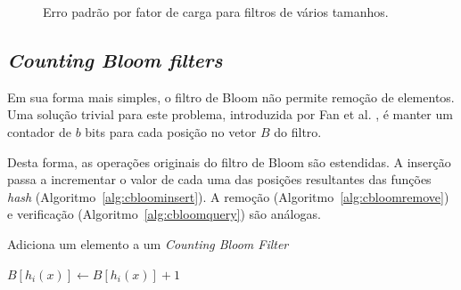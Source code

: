\begin{figure}[!htbp]
\centering
{}
\caption{Erro padrão por fator de carga para filtros de vários tamanhos.}
\label{fig:bloom_cardinality}
\end{figure}


\subsection{\emph{Counting Bloom filters}}\label{sec:bloom:counting}

Em sua forma mais simples, o filtro de Bloom não permite remoção de elementos. Uma solução trivial para este problema, introduzida por Fan et al. \cite{fan1998summary}, é manter um contador de $b$ bits para cada posição no vetor $B$ do filtro.

Desta forma, as operações originais do filtro de Bloom são estendidas. A inserção passa a incrementar o valor de cada uma das posições resultantes das funções \emph{hash} (Algoritmo~\ref{alg:cbloominsert}). A remoção (Algoritmo~\ref{alg:cbloomremove}) e verificação (Algoritmo~\ref{alg:cbloomquery}) são análogas.


\begin{algorithm}[!htbp]
\linespread{1}\selectfont
\caption{Adiciona um elemento a um \emph{Counting Bloom Filter}}
\label{alg:cbloominsert}
\begin{algorithmic}[1]
            \State $B[h_i(x)] \gets B[h_i(x)]+1$
        \EndIf
	\EndFor
\EndProcedure
\end{algorithmic}
\end{algorithm}

